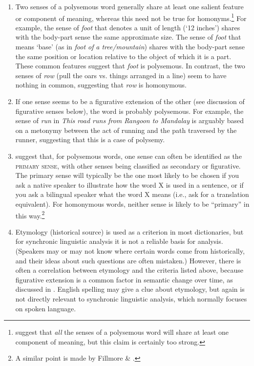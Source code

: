 \begin{enumerate}[label=\alph*.]
\item Two senses of a polysemous word generally share at least one salient feature or component of meaning, whereas this need not be true for homonyms.\footnote{\citet{BeekmanCallow1974} suggest that \textit{all} the senses of a polysemous word will share at least one component of meaning, but this claim is certainly too strong.} For example, the sense of \textit{foot} that denotes a unit of length (‘12 inches’) shares with the body-part sense the same approximate size. The sense of \textit{foot} that means ‘base’ (as in \textit{foot of} \textit{a tree/mountain}) shares with the body-part sense the same position or location relative to the object of which it is a part. These common features suggest that \textit{foot} is polysemous. In contrast, the two senses of \textit{row} (pull the oars vs. things arranged in a line) seem to have nothing in common, suggesting that \textit{row} is homonymous.
\item If one sense seems to be a figurative extension of the other (see discussion of figurative senses below), the word is probably polysemous. For example, the sense of \textit{run} in \textit{This road runs from Rangoon to Mandalay} is arguably based on a metonymy between the act of running and the path traversed by the runner, suggesting that this is a case of polysemy.
\item \citet{BeekmanCallow1974} suggest that, for polysemous words, one sense can often be identified as the \textsc{primary sense}, with other senses being classified as secondary or figurative. The primary sense will typically be the one most likely to be chosen if you ask a native speaker to illustrate how the word X is used in a sentence, or if you ask a bilingual speaker what the word X means (i.e., ask for a translation equivalent). For homonymous words, neither sense is likely to be “primary” in this way.\footnote{A similar point is made by Fillmore \& \citet[100]{Atkins2000}.}
\item Etymology (historical source) is used as a criterion in most dictionaries, but for synchronic linguistic analysis it is not a reliable basis for analysis. (Speakers may or may not know where certain words come from historically, and their ideas about such questions are often mistaken.) However, there is often a correlation between etymology and the criteria listed above, because figurative extension is a common factor in semantic change over time, as discussed in . English spelling may give a clue about etymology, but again is not directly relevant to synchronic linguistic analysis, which normally focuses on spoken language.
\end{enumerate}

